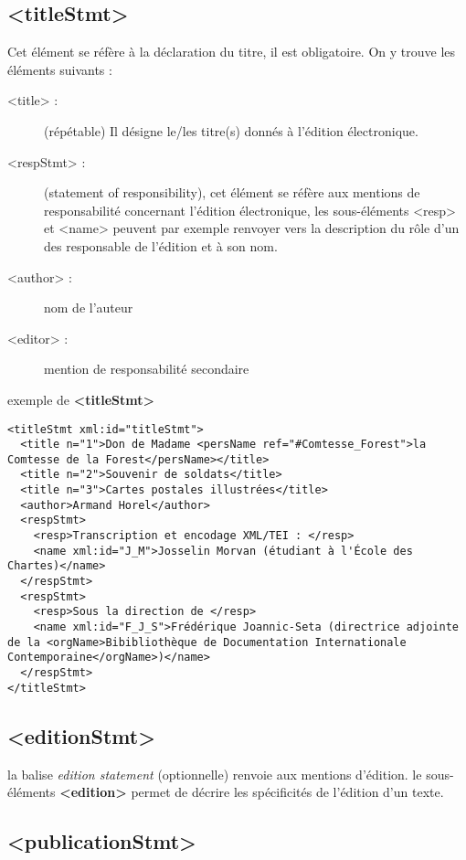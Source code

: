 \documentclass[18pt,a4paper,oneside]{book} %
\begin{document}
\subsection{<titleStmt>}

Cet élément se réfère à la déclaration du titre, il est obligatoire. On y trouve les éléments suivants : 

	\begin{description}
	\item [<title> : ](répétable) Il désigne le/les titre(s) donnés à l'édition électronique.
	\item [<respStmt> : ](statement of responsibility), cet élément se réfère aux mentions de responsabilité concernant l'édition électronique, les sous-éléments <resp> et <name> peuvent par exemple renvoyer vers la description du rôle d'un des responsable de l'édition et à son nom.
	\item [<author> : ]nom de l'auteur
	\item [<editor> :] mention de responsabilité secondaire
	\end{description}
\bigskip 

exemple de \textbf{<titleStmt>}
\begin{lstlisting}
<titleStmt xml:id="titleStmt">
  <title n="1">Don de Madame <persName ref="#Comtesse_Forest">la Comtesse de la Forest</persName></title>
  <title n="2">Souvenir de soldats</title>
  <title n="3">Cartes postales illustrées</title>
  <author>Armand Horel</author>            
  <respStmt>
    <resp>Transcription et encodage XML/TEI : </resp>
    <name xml:id="J_M">Josselin Morvan (étudiant à l'École des Chartes)</name>
  </respStmt>
  <respStmt>
    <resp>Sous la direction de </resp>
    <name xml:id="F_J_S">Frédérique Joannic-Seta (directrice adjointe de la <orgName>Bibibliothèque de Documentation Internationale Contemporaine</orgName>)</name>
  </respStmt>
</titleStmt>
\end{lstlisting}
\subsection{<editionStmt>}

la balise \textit{edition statement} (optionnelle) renvoie aux mentions d'édition. 
le sous-éléments \textbf{<edition>} permet de décrire les spécificités de l'édition d'un texte.

\subsection{<publicationStmt>}
\end{document}
